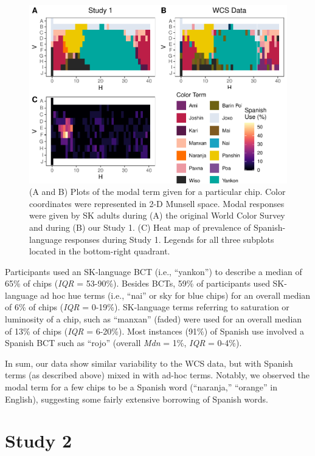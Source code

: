 \documentclass[
  english,
  ,man,floatsintext]{apa6}
\begin{document}
\begin{figure}
\centering
\includegraphics{amazon_color_files/figure-latex/study1-figure-1.pdf}
\caption{\label{fig:study1-figure}(A and B) Plots of the modal term given for a particular chip. Color coordinates were represented in 2-D Munsell space. Modal responses were given by SK adults during (A) the original World Color Survey and during (B) our Study 1. (C) Heat map of prevalence of Spanish-language responses during Study 1. Legends for all three subplots located in the bottom-right quadrant.}
\end{figure}

Participants used an SK-language BCT (i.e., \enquote{yankon}) to describe a median of 65\% of chips (\emph{IQR} = 53-90\%). Besides BCTs, 59\% of participants used SK-language ad hoc hue terms (i.e., \enquote{nai} or sky for blue chips) for an overall median of 6\% of chips (\emph{IQR} = 0-19\%). SK-language terms referring to saturation or luminosity of a chip, such as \enquote{manxan} (faded) were used for an overall median of 13\% of chips (\emph{IQR} = 6-20\%). Most instances (91\%) of Spanish use involved a Spanish BCT such as \enquote{rojo} (overall \emph{Mdn} = 1\%, \emph{IQR} = 0-4\%).

In sum, our data show similar variability to the WCS data, but with Spanish terms (as described above) mixed in with ad-hoc terms. Notably, we observed the modal term for a few chips to be a Spanish word (\enquote{naranja,} \enquote{orange} in English), suggesting some fairly extensive borrowing of Spanish words.

\hypertarget{study-2}{%
\section{Study 2}\label{study-2}}
\end{document}
